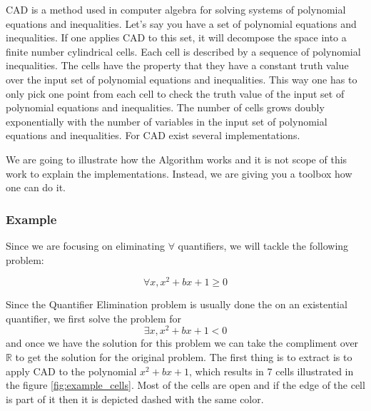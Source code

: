 CAD is a method used in computer algebra for solving systems of polynomial equations and inequalities.
Let's say you have a set of polynomial equations and inequalities.
If one applies CAD to this set, it will decompose the space into a finite number cylindrical cells.
Each cell is described by a sequence of polynomial inequalities.
The cells have the property that they have a constant truth value over the input set of polynomial equations and inequalities.
This way one has to only pick one point from each cell to check the truth value of the input set of polynomial equations and inequalities.
The number of cells grows doubly exponentially with the number of variables in the input set of polynomial equations and inequalities.
For CAD exist several implementations.

We are going to illustrate how the Algorithm works and it is not scope of this work to explain the implementations.
Instead, we are giving you a toolbox how one can do it.

\subsubsection{Example}
Since we are focusing on eliminating $\forall$ quantifiers, we will tackle the following problem:

\[ \forall x, x^2 + bx + 1 \geq
	0 \]

Since the Quantifier Elimination problem is usually done the on an existential quantifier, we first solve the problem for \[
	\exists x, x^2 + bx + 1 < 0 \] and once we have the solution for this problem we can take the compliment over $\mathbb{R}$ to get the solution for
the original problem.
The first thing is to extract is to apply CAD to the polynomial $x^2 + bx + 1$, which results in 7 cells illustrated in the figure
\ref{fig:example_cells}.
Most of the cells are open and if the edge of the cell is part of it then it is depicted dashed with the same color.

